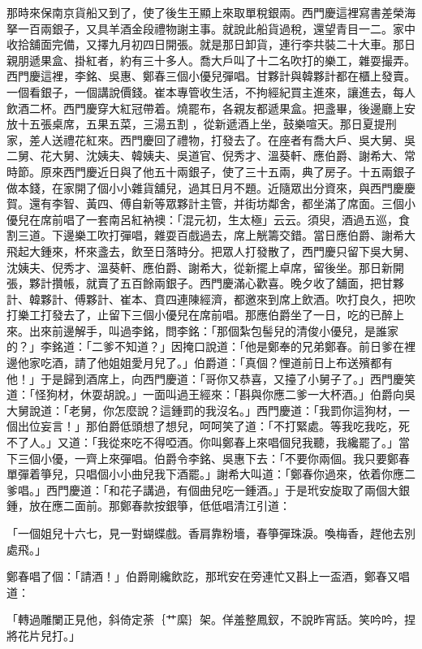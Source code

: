 \begin{showcontents}{}
那時來保南京貨船又到了，使了後生王顯上來取單稅銀兩。西門慶這裡寫書差榮海拏一百兩銀子，又具羊酒金段禮物謝主事。就說此船貨過稅，還望青目一二。家中收拾舖面完備，又擇九月初四日開張。就是那日卸貨，連行李共裝二十大車。那日親朋遞果盒、掛紅者，約有三十多人。喬大戶叫了十二名吹打的樂工，雜耍撮弄。西門慶這裡，李銘、吳惠、鄭春三個小優兒彈唱。甘夥計與韓夥計都在櫃上發賣。一個看銀子，一個講說價錢。崔本專管收生活，不拘經紀買主進來，讓進去，每人飲酒二杯。西門慶穿大紅冠帶着。燒罷布，各親友都遞果盒。把盞畢，後邊廳上安放十五張桌席，五果五菜，三湯五割 ，從新遞酒上坐，鼓樂喧天。那日夏提刑家，差人送禮花紅來。西門慶回了禮物，打發去了。在座者有喬大戶、吳大舅、吳二舅、花大舅、沈姨夫、韓姨夫、吳道官、倪秀才、溫葵軒、應伯爵、謝希大、常時節。原來西門慶近日與了他五十兩銀子，使了三十五兩，典了房子。十五兩銀子做本錢，在家開了個小小雜貨舖兒，過其日月不題。近隨眾出分資來，與西門慶慶賀。還有李智、黃四、傅自新等眾夥計主管，并街坊鄰舍，都坐滿了席面。三個小優兒在席前唱了一套南呂紅衲襖：「混元初，生太極」云云。須臾，酒過五巡，食割三道。下邊樂工吹打彈唱，雜耍百戲過去，席上觥籌交錯。當日應伯爵、謝希大飛起大鍾來，杯來盞去，飲至日落時分。把眾人打發散了，西門慶只留下吳大舅、沈姨夫、倪秀才、溫葵軒、應伯爵、謝希大，從新擺上卓席，留後坐。那日新開張，夥計攢帳，就賣了五百餘兩銀子。西門慶滿心歡喜。晚夕收了舖面，把甘夥計、韓夥計、傅夥計、崔本、賁四連陳經濟，都邀來到席上飲酒。吹打良久，把吹打樂工打發去了，止留下三個小優兒在席前唱。那應伯爵坐了一日，吃的已醉上來。出來前邊解手，叫過李銘，問李銘：「那個紮包髻兒的清俊小優兒，是誰家的？」李銘道：「二爹不知道？」因掩口說道：「他是鄭奉的兄弟鄭春。前日爹在裡邊他家吃酒，請了他姐姐愛月兒了。」伯爵道：「真個？悝道前日上布送殯都有他！」于是歸到酒席上，向西門慶道：「哥你又恭喜，又擡了小舅子了。」西門慶笑道：「怪狗材，休耍胡說。」一面叫過王經來：「斟與你應二爹一大杯酒。」伯爵向吳大舅說道：「老舅，你怎麼說？這鍾罰的我沒名。」西門慶道：「我罰你這狗材，一個出位妄言！」那伯爵低頭想了想兒，呵呵笑了道：「不打緊處。等我吃我吃，死不了人。」又道：「我從來吃不得啞酒。你叫鄭春上來唱個兒我聽，我纔罷了。」當下三個小優，一齊上來彈唱。伯爵令李銘、吳惠下去：「不要你兩個。我只要鄭春單彈着箏兒，只唱個小小曲兒我下酒罷。」謝希大叫道：「鄭春你過來，依着你應二爹唱。」西門慶道：「和花子講過，有個曲兒吃一鍾酒。」于是玳安旋取了兩個大銀鍾，放在應二面前。那鄭春款按銀箏，低低唱清江引道：

「一個姐兒十六七，見一對蝴蝶戲。香肩靠粉墻，春箏彈珠淚。喚梅香，趕他去別處飛。」

鄭春唱了個：「請酒！」伯爵剛纔飲訖，那玳安在旁連忙又斟上一盃酒，鄭春又唱道：

「轉過雕闌正見他，斜倚定荼｛艹縻｝架。佯羞整鳳釵，不說昨宵話。笑吟吟，捏將花片兒打。」


\end{showcontents}
